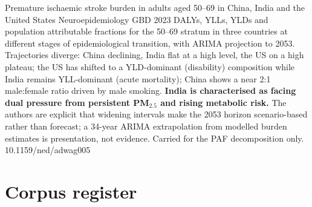 \documentclass[10pt]{article}
\begin{document}

{Premature ischaemic stroke burden in adults aged 50--69 in China, India and the United States}
{Neuroepidemiology}
{GBD 2023 DALYs, YLLs, YLDs and population attributable fractions for the 50--69 stratum
in three countries at different stages of epidemiological transition, with ARIMA
projection to 2053. Trajectories diverge: China declining, India flat at a high level,
the US on a high plateau; the US has shifted to a YLD-dominant (disability) composition
while India remains YLL-dominant (acute mortality); China shows a near 2:1 male:female
ratio driven by male smoking. \textbf{India is characterised as facing dual pressure from
persistent PM$_{2.5}$ and rising metabolic risk.} The authors are explicit that widening
intervals make the 2053 horizon scenario-based rather than forecast; a 34-year ARIMA
extrapolation from modelled burden estimates is presentation, not evidence. Carried for
the PAF decomposition only.}
{10.1159/ned/adwag005}

\clearpage

\section*{\sffamily\bfseries\color{Deep}Corpus register}
\vspace{-1.5mm}{\color{Amber}\rule{\linewidth}{1.1pt}}\vspace{2.5mm}


\end{document}
